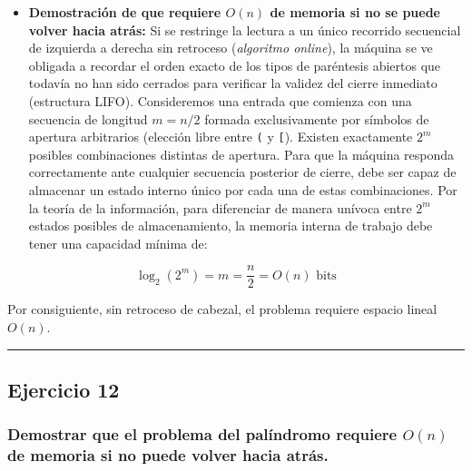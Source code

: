 \documentclass[12pt]{book} %
\providecommand{\tightlist}{%
  \setlength{\itemsep}{0pt}\setlength{\parskip}{0pt}}
\begin{document}
\begin{itemize}
\tightlist
\item
  \textbf{Demostración de que requiere \(O(n)\) de memoria si no se
  puede volver hacia atrás:} Si se restringe la lectura a un único
  recorrido secuencial de izquierda a derecha sin retroceso
  (\emph{algoritmo online}), la máquina se ve obligada a recordar el
  orden exacto de los tipos de paréntesis abiertos que todavía no han
  sido cerrados para verificar la validez del cierre inmediato
  (estructura LIFO). Consideremos una entrada que comienza con una
  secuencia de longitud \(m = n/2\) formada exclusivamente por símbolos
  de apertura arbitrarios (elección libre entre \texttt{(} y
  \texttt{{[}}). Existen exactamente \(2^m\) posibles combinaciones
  distintas de apertura. Para que la máquina responda correctamente ante
  cualquier secuencia posterior de cierre, debe ser capaz de almacenar
  un estado interno único por cada una de estas combinaciones. Por la
  teoría de la información, para diferenciar de manera unívoca entre
  \(2^m\) estados posibles de almacenamiento, la memoria interna de
  trabajo debe tener una capacidad mínima de:
\end{itemize}

\[\log_2(2^m) = m = \frac{n}{2} = O(n) \text{ bits}\]

Por consiguiente, sin retroceso de cabezal, el problema requiere espacio
lineal \textbf{\(O(n)\)}.

\begin{center}\rule{0.5\linewidth}{0.5pt}\end{center}

\hypertarget{ejercicio-12}{%
\subsection{Ejercicio 12}\label{ejercicio-12}}

\hypertarget{demostrar-que-el-problema-del-paluxedndromo-requiere-on-de-memoria-si-no-puede-volver-hacia-atruxe1s.}{%
\subsubsection{\texorpdfstring{Demostrar que el problema del palíndromo
requiere \(O(n)\) de memoria si no puede volver hacia
atrás.}{Demostrar que el problema del palíndromo requiere O(n) de memoria si no puede volver hacia atrás.}}\label{demostrar-que-el-problema-del-paluxedndromo-requiere-on-de-memoria-si-no-puede-volver-hacia-atruxe1s.}}
\end{document}
